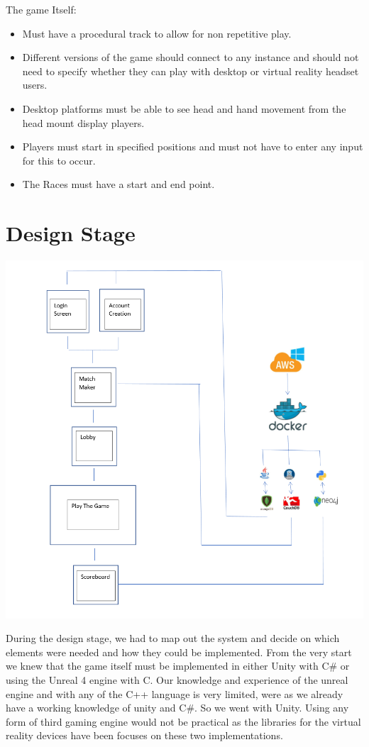 The game Itself:
\begin{itemize}
\item Must have a procedural track to allow for non repetitive play.
\item Different versions of the game should connect to any instance and should not need to specify whether they can play with desktop or virtual reality headset users.
\item Desktop platforms must be able to see head and hand movement from the head mount display players.
\item Players must start in specified positions and must not have to enter any input for this to occur.
\item The Races must have a start and end point.
\end{itemize}

\newpage
\section{Design Stage}

\includegraphics[width=1\columnwidth]{img/Overview.PNG}

During the design stage, we had to map out the system and decide on which elements were needed and how they could be implemented. From the very start we knew that the game itself must be implemented in either Unity with C\# or using the Unreal 4 engine with C\+\+. Our knowledge and experience of the unreal engine and with any of the C++ language is very limited, were as we already have a working knowledge of unity and C\#. So we went with Unity. Using any form of third gaming engine would not be practical as the libraries for the virtual reality devices have been focuses on these two implementations.\newline

